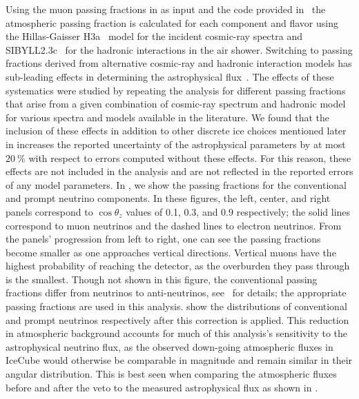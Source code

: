 Using the muon passing fractions in  as input and the \nuveto{} code provided in~\cite{Arguelles:2018awr} the atmospheric passing fraction is calculated for each component and flavor using the Hillas-Gaisser H3a~\cite{Gaisser:2013bla,Gaisser:2011cc,Hillas:2006ms} model for the incident cosmic-ray spectra and SIBYLL2.3c~\cite{Riehn:2017mfm} for the hadronic interactions in the air shower.
Switching to passing fractions derived from alternative cosmic-ray and hadronic interaction models has sub-leading effects in determining the astrophysical flux~\cite{Arguelles:2018awr}.
The effects of these systematics were studied by repeating the analysis for different passing fractions that arise from a given combination of cosmic-ray spectrum and hadronic model for various spectra and models available in the literature.
We found that the inclusion of these effects in addition to other discrete ice choices mentioned later in  increases the reported uncertainty of the astrophysical parameters by at most $\SI{20}\percent$ with respect to errors computed without these effects.
For this reason, these effects are not included in the analysis and are not reflected in the reported errors of any model parameters.
In , we show the passing fractions for the conventional and prompt neutrino components.
In these figures, the left, center, and right panels correspond to $\cos\theta_z$ values of 0.1, 0.3, and 0.9 respectively; the solid lines correspond to muon neutrinos and the dashed lines to electron neutrinos.
From the panels' progression from left to right, one can see the passing fractions become smaller as one approaches vertical directions.
Vertical muons have the highest probability of reaching the detector, as the overburden they pass through is the smallest.
Though not shown in this figure, the conventional passing fractions differ from neutrinos to anti-neutrinos, see~\cite{Arguelles:2018awr} for details; the appropriate passing fractions are used in this analysis.
 show the distributions of conventional and prompt neutrinos respectively after this correction is applied.
This reduction in atmospheric background accounts for much of this analysis's sensitivity to the astrophysical neutrino flux, as the observed down-going atmospheric fluxes in IceCube would otherwise be comparable in magnitude and remain similar in their angular distribution.
This is best seen when comparing the atmospheric fluxes before and after the veto to the measured astrophysical flux as shown in .

